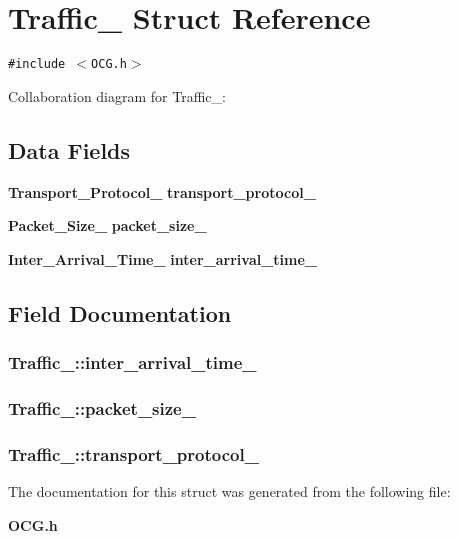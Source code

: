 \section{Traffic\_\- Struct Reference}
\label{structTraffic__}
{\tt \#include $<$OCG.h$>$}

Collaboration diagram for Traffic\_\-:\subsection*{Data Fields}
\begin{CompactItemize}
\item 
{\bf Transport\_\-Protocol\_\-} {\bf transport\_\-protocol\_\-}
\item 
{\bf Packet\_\-Size\_\-} {\bf packet\_\-size\_\-}
\item 
{\bf Inter\_\-Arrival\_\-Time\_\-} {\bf inter\_\-arrival\_\-time\_\-}
\end{CompactItemize}


\subsection{Field Documentation}
\subsubsection[{inter\_\-arrival\_\-time\_\-}]{ {\bf Traffic\_\-::inter\_\-arrival\_\-time\_\-}}\label{structTraffic___030a94a6dc4bdf822fc992e6f3077043}


\subsubsection[{packet\_\-size\_\-}]{ {\bf Traffic\_\-::packet\_\-size\_\-}}\label{structTraffic___3319a220b643dbff113d72da1acf1a3d}


\subsubsection[{transport\_\-protocol\_\-}]{ {\bf Traffic\_\-::transport\_\-protocol\_\-}}\label{structTraffic___7d071698014ee0aab7dd8baeaf39bd51}




The documentation for this struct was generated from the following file:\begin{CompactItemize}
\item 
{\bf OCG.h}\end{CompactItemize}
